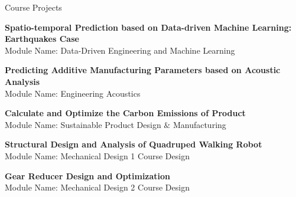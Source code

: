\documentclass{resume} %
\begin{document}
\begin{rSection}{Course Projects }
	
\begin{rSubsection}{}{}
{}{}
\item {{\bf Spatio-temporal Prediction based on Data-driven Machine Learning: Earthquakes Case}\\ Module Name: Data-Driven Engineering and Machine Learning}\\

\item {{\bf Predicting Additive Manufacturing Parameters based on Acoustic Analysis}\\ Module Name: Engineering Acoustics}\\

\item {{\bf Calculate and Optimize the Carbon Emissions of Product}\\ Module Name: Sustainable Product Design $\&$ Manufacturing}\\

\item {{\bf Structural Design and Analysis of Quadruped Walking Robot} \\ Module Name: Mechanical Design 1 Course Design}\\

\item {{\bf Gear Reducer Design and Optimization}\\ Module Name: Mechanical Design 2 Course Design}\\
\end{rSubsection}

	
\end{rSection}
\end{document}
